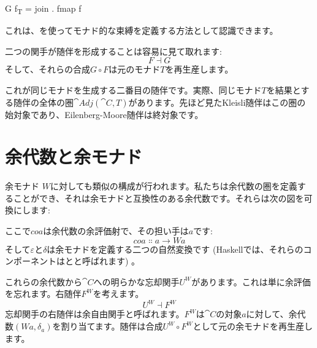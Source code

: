 \begin{snipv}
G f\textsubscript{T} = join . fmap f
\end{snipv}
これは、を使ってモナド的な束縛を定義する方法として認識できます。

二つの関手が随伴を形成することは容易に見て取れます: 
\[F \dashv G\]
そして、それらの合成$G \circ F$は元のモナド$T$を再生産します。

これが同じモナドを生成する二番目の随伴です。実際、同じモナド$T$を結果とする随伴の全体の圏$\cat{Adj}(\cat{C}, T)$があります。先ほど見たKleisli随伴はこの圏の始対象であり、Eilenberg-Moore随伴は終対象です。

\section{余代数と余モナド}

余モナド
$W$に対しても類似の構成が行われます。私たちは余代数の圏を定義することができ、それは余モナドと互換性のある余代数です。それらは次の図を可換にします: 

\begin{figure}[H]
  \centering
  \begin{subfigure}
    \centering
  \end{subfigure}%
  \hspace{1cm}
  \begin{subfigure}
    \centering
  \end{subfigure}
\end{figure}

\noindent
ここで$\mathit{coa}$は余代数の余評価射で、その担い手は$a$です: 
\[\mathit{coa} \Colon a \to W a\]
そして$\varepsilon$と$\delta$は余モナドを定義する二つの自然変換です (Haskellでは、それらのコンポーネントはとと呼ばれます) 。

これらの余代数から$\cat{C}$への明らかな忘却関手$U^W$があります。これは単に余評価を忘れます。右随伴$F^W$を考えます。
\[U^W \dashv F^W\]
忘却関手の右随伴は余自由関手と呼ばれます。$F^W$は$\cat{C}$の対象$a$に対して、余代数$(W a, \delta_a)$を割り当てます。随伴は合成$U^W \circ F^W$として元の余モナドを再生産します。

